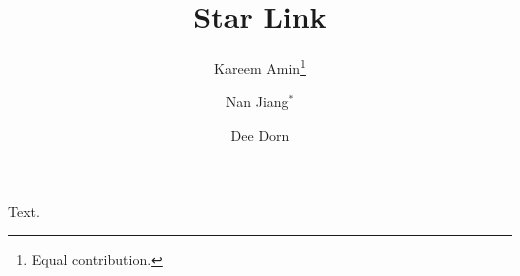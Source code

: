 \documentclass{article}
\title{Star Link}
\author{Kareem Amin\thanks{Equal contribution.} \and Nan Jiang$^*$ \and Dee Dorn}
\begin{document}
\maketitle
Text.
\end{document}
